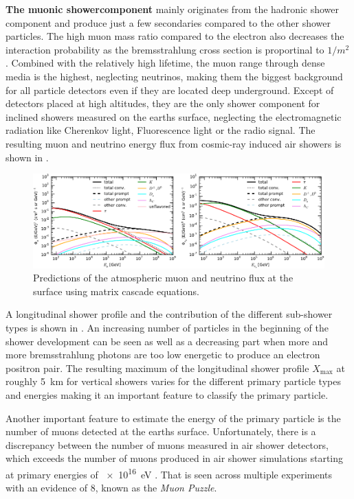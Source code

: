 \textbf{The muonic showercomponent} mainly originates from the hadronic shower component and produce just a few secondaries compared to the other shower particles.
The high muon mass ratio compared to the electron also decreases the interaction probability as the bremsstrahlung cross section is proportinal to $1/m^2$.
Combined with the relatively high lifetime, the muon range through dense media is the highest, neglecting neutrinos, making them the biggest background for all particle detectors even if they are located deep underground.
Except of detectors placed at high altitudes, they are the only shower component for inclined showers measured on the earths surface, neglecting the electromagnetic radiation like Cherenkov light, Fluorescence light or the radio signal.
The resulting muon and neutrino energy flux from cosmic-ray induced air showers is shown in .
\begin{figure}
    \centering
    \includegraphics[width=\textwidth]{./images/mceq_mu_nu_flux.pdf}
    \caption{Predictions of the atmospheric muon and neutrino flux at the surface using matrix cascade equations. \cite{Fedynitch15MCEq}}
    \label{fig:atmo_mu_nu_flux}
\end{figure}

A longitudinal shower profile and the contribution of the different sub-shower types is shown in .
An increasing number of particles in the beginning of the shower development can be seen as well as a decreasing part when more and more bremsstrahlung photons are too low energetic to produce an electron positron pair.
The resulting maximum of the longitudinal shower profile $X_{\mathrm{max}}$ at roughly \SI{5}{km} for vertical showers varies for the different primary particle types and energies making it an important feature to classify the primary particle.

Another important feature to estimate the energy of the primary particle is the number of muons detected at the earths surface.
Unfortunately, there is a discrepancy between the number of muons measured in air shower detectors, which exceeds the number of muons produced in air shower simulations starting at primary energies of \SI{e16}{eV} \cite{Dembinski19MuonPuzzle}.
That is seen across multiple experiments with an evidence of \SI{8}{\sigma}, known as the \textit{Muon Puzzle}.

